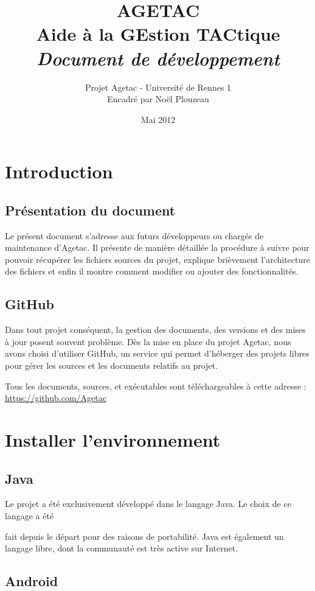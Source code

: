 \documentclass{article}
\title{\Huge{AGETAC\\
Aide à la GEstion TACtique\\}
\huge{{\color{color02} \textit{Document de développement}}}}
\date{Mai 2012}
\author{Projet Agetac - Université de Rennes 1\\
Encadré par Noël Plouzeau}
\begin{document}
\maketitle
\tableofcontents
\newpage


\section{Introduction}

\subsection{Présentation du document}

Le présent document s'adresse aux futurs développeurs ou chargés de maintenance d’Agetac. Il présente de manière détaillée la procédure à suivre pour pouvoir récupérer les fichiers sources du projet, explique brièvement l'architecture des fichiers et enfin il montre comment modifier ou ajouter des fonctionnalités.

\subsection{GitHub}

Dans tout projet conséquent, la gestion des documents, des versions et des mises à jour posent souvent problème. Dès la mise en place du projet Agetac, nous avons choisi d'utiliser GitHub, un service qui permet d'héberger des projets libres pour gérer les sources et les documents relatifs au projet.

Tous les documents, sources, et exécutables sont téléchargeables à cette adresse :\\ \url{https://github.com/Agetac}

\section{Installer l'environnement}


\subsection{Java}

Le projet a été exclusivement développé dans le langage Java. Le choix de ce langage a été

fait depuis le départ pour des raisons de portabilité. Java est également un langage libre, dont la communauté est très active sur Internet.


\subsection{Android}
\end{document}
